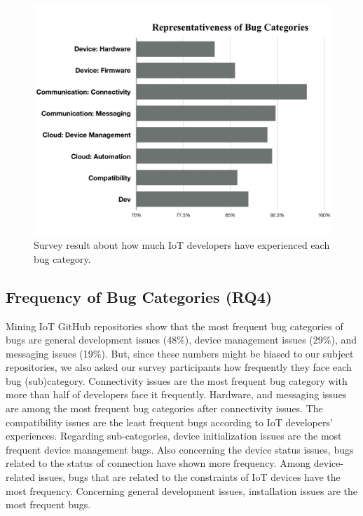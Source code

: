  \begin{figure}%
  \centering
   \includegraphics[width=\linewidth]{imgs/bugRep}
  \caption{Survey result about how much IoT developers have experienced each bug category.}
  \label{fig:bugRep}
\end{figure}

\subsection{Frequency of Bug Categories (RQ4)}
Mining IoT GitHub repositories show that the most frequent bug categories of bugs are general development issues (48\%), device management issues (29\%), and messaging issues (19\%). But, since these numbers might be biased to our subject repositories, we also asked our survey participants how frequently they face each bug (sub)category. Connectivity issues are the most frequent bug category with more than half of developers face it frequently. Hardware, and messaging issues are among the most frequent bug categories after connectivity issues. 
The compatibility issues are the least frequent bugs according to IoT developers' experiences. Regarding sub-categories, device initialization issues are the most frequent device management bugs. Also concerning the device status issues, bugs related to the status of connection have shown more frequency. Among device-related issues, bugs that are related to the constraints of IoT devices have the most frequency. Concerning general development issues, installation issues are the most frequent bugs. 

